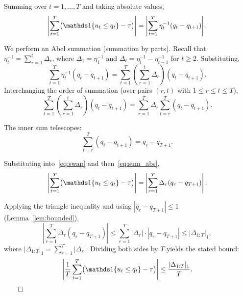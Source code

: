 Summing over $t = 1, \ldots, T$ and taking absolute values,
\begin{equation}\label{eq:sum_abs}
    \left|\sum_{t=1}^{T}\bigl(\ind\{u_t \leq q_t\} - \tau\bigr)\right| = \left|\sum_{t=1}^{T} \eta_t^{-1}(q_t - q_{t+1})\right|.
\end{equation}

We perform an Abel summation (summation by parts). Recall that $\eta_t^{-1} = \sum_{r=1}^{t} \Delta_r$, where $\Delta_1 = \eta_1^{-1}$ and $\Delta_t = \eta_t^{-1} - \eta_{t-1}^{-1}$ for $t \geq 2$. Substituting,
\begin{equation}\label{eq:double_sum}
    \sum_{t=1}^{T} \eta_t^{-1}(q_t - q_{t+1}) = \sum_{t=1}^{T} \left(\sum_{r=1}^{t} \Delta_r\right)(q_t - q_{t+1}).
\end{equation}
Interchanging the order of summation (over pairs $(r,t)$ with $1 \leq r \leq t \leq T$),
\begin{equation}\label{eq:swap}
    \sum_{t=1}^{T} \left(\sum_{r=1}^{t} \Delta_r\right)(q_t - q_{t+1}) = \sum_{r=1}^{T} \Delta_r \sum_{t=r}^{T} (q_t - q_{t+1}).
\end{equation}

The inner sum telescopes:
\begin{equation}\label{eq:telescope}
    \sum_{t=r}^{T} (q_t - q_{t+1}) = q_r - q_{T+1}.
\end{equation}

Substituting into~\eqref{eq:swap} and then~\eqref{eq:sum_abs},
\begin{equation}\label{eq:final_bound}
    \left|\sum_{t=1}^{T}\bigl(\ind\{u_t \leq q_t\} - \tau\bigr)\right| = \left|\sum_{r=1}^{T} \Delta_r (q_r - q_{T+1})\right|.
\end{equation}

Applying the triangle inequality and using $|q_r - q_{T+1}| \leq 1$ (Lemma~\ref{lem:bounded}),
\begin{equation}\label{eq:triangle}
    \left|\sum_{r=1}^{T} \Delta_r (q_r - q_{T+1})\right| \leq \sum_{r=1}^{T} |\Delta_r| \cdot |q_r - q_{T+1}| \leq |\Delta_{1:T}|_1,
\end{equation}
where $|\Delta_{1:T}|_1 = \sum_{r=1}^{T} |\Delta_r|$. Dividing both sides by $T$ yields the stated bound:
\begin{equation}
    \left|\frac{1}{T}\sum_{t=1}^{T}\bigl(\ind\{u_t \leq q_t\} - \tau\bigr)\right| \leq \frac{|\Delta_{1:T}|_1}{T}.
\end{equation}
$\hfill\qed$


